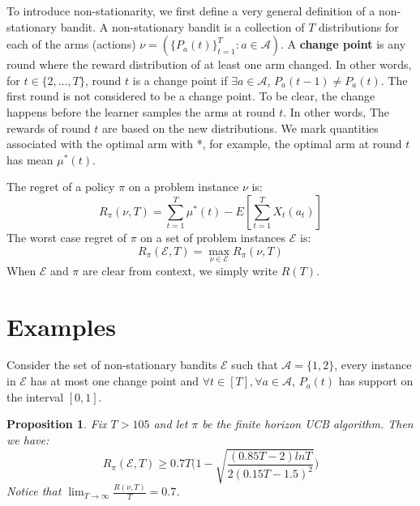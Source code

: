 \documentclass[opre,nonblindrev]{informs3} %
\newtheorem{proposition}{Proposition}
\begin{document}
To introduce non-stationarity, we first define a very general definition of a non-stationary bandit. A non-stationary bandit is a collection of $T$ distributions for each of the arms (actions) $\nu=(\{P_a(t)\}_{t=1}^{T}:a\in\mathcal{A})$.
A \textbf{change point} is any round where the reward distribution of at least one arm changed. In other words, for $t \in \{2, \ldots, T\}$, round $t$ is a change point if $\exists a\in \mathcal{A}$, $P_a(t-1)\neq P_a(t)$. The first round is not considered to be a change point. To be clear, the change happens before the learner samples the arms at round $t$. In other words, The rewards of round $t$ are based on the new distributions. We mark quantities associated with the optimal arm with *, for example, the optimal arm at round $t$ has mean $\mu^*(t)$.

The regret of a policy $\pi$ on a problem instance $\nu$ is:
    $$R_{\pi}(\nu, T) = \sum\limits_{t=1}^{T}\mu^*(t) - E[\sum\limits_{t=1}^{T}X_t(a_t)]$$
The worst case regret of $\pi$ on a set of problem instances $\mathcal{E}$ is:
$$R_{\pi}(\mathcal{E}, T) = \max_{\nu\in \mathcal{E}} R_{\pi}(\nu, T)$$
When $\mathcal{E}$ and $\pi$ are clear from context, we simply write $R(T)$.
\section{Examples}
Consider the set of non-stationary bandits $\mathcal{E}$ such that $\mathcal{A} = \{1, 2\}$, every instance in $\mathcal{E}$ has at most one change point and $\forall t \in [T], \forall a\in \mathcal{A}$, $P_a(t)$ has support on the interval $[0, 1]$.
\begin{proposition}
    Fix $T>105$ and let $\pi$ be the finite horizon UCB algorithm. Then we have:
    \begin{equation}
        R_\pi(\mathcal{E}, T) \geq 0.7T\Bigg(1-\sqrt{\frac{(0.85T-2)lnT}{2(0.15T-1.5)^2}}\Bigg)
    \end{equation}
    Notice that $\lim_{{T \to \infty}}\frac{R(\nu, T)}{T} = 0.7$.
    \label{prop:UCB_weak_lower_bound}
\end{proposition}
\end{document}
